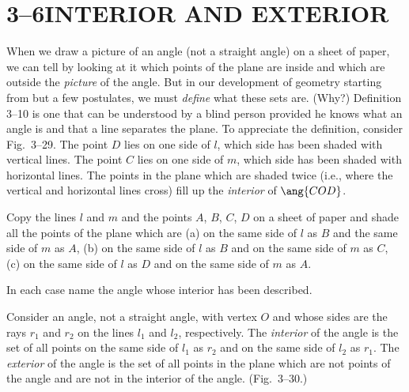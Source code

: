 \documentclass[11pt]{book}
\theoremstyle{bkplain}
\theoremstyle{XIplainnote}
\theoremstyle{bkplain}
\theoremstyle{bkplain}
\begin{document}
\section*{3--6\quad INTERIOR AND EXTERIOR}

When we draw a picture of an angle (not a straight angle) on a sheet of paper, we
can tell by looking at it which points of the plane are inside and which are
outside the \emph{picture} of the angle. But in our development of geometry
starting from but a few postulates, we must \emph{define} what these sets are.
(Why?) Definition 3--10 is one that can be understood by a blind person provided
he knows what an angle is and that a line separates the plane. To appreciate the
definition, consider Fig.~3--29. The point $D$ lies on one side of $l$, which
side has been shaded with vertical lines. The point $C$ lies on one side of $m$,
which side has been shaded with horizontal lines. The points in the plane which
are shaded twice (i.e., where the vertical and horizontal lines cross) fill up
the \emph{interior} of $\ang{COD}$.

\FIGIIITWENTYNINETHIRTY

\begin{exercisecols}
\begin{exlist}
\item Copy the lines $l$ and $m$ and the points $A$, $B$, $C$, $D$ on a sheet of
      paper and shade all the points of the plane which are (a) on the same side
      of $l$ as $B$ and the same side of $m$ as $A$, (b) on the same side of $l$
      as $B$ and on the same side of $m$ as $C$, (c) on the same side of $l$ as
      $D$ and on the same side of $m$ as $A$.
\item In each case name the angle whose interior has been described.
\end{exlist}
\end{exercisecols}

\begin{definition}
Consider an angle, not a straight angle, with vertex $O$ and whose sides are the
rays $r_1$ and $r_2$ on the lines $l_1$ and $l_2$, respectively. The
\emph{interior} of the angle is the set of all points on the same side of $l_1$
as $r_2$ and on the same side of $l_2$ as $r_1$. The \emph{exterior} of the angle
is the set of all points in the plane which are not points of the angle and are
not in the interior of the angle. (Fig.~3--30.)
\end{definition}
\end{document}
